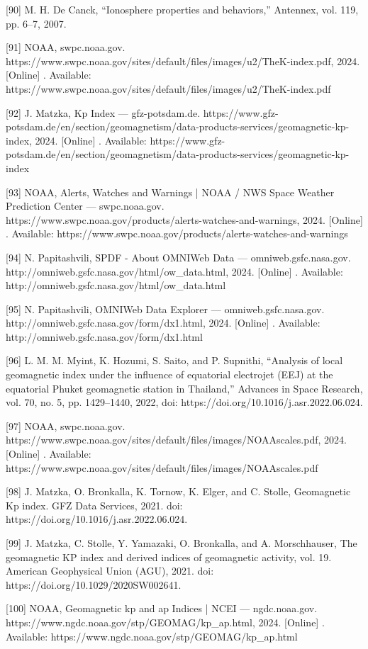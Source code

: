 \documentclass[sn-mathphys-num]{sn-jnl}%
\begin{document}
[90] M. H. De Canck, “Ionosphere properties and behaviors,” Antennex, vol. 119, pp. 6–7, 2007.

[91] NOAA, swpc.noaa.gov. https://www.swpc.noaa.gov/sites/default/files/images/u2/TheK-index.pdf, 2024. [Online] . Available: https://www.swpc.noaa.gov/sites/default/files/images/u2/TheK-index.pdf

[92] J. Matzka, Kp Index — gfz-potsdam.de. https://www.gfz-potsdam.de/en/section/geomagnetism/data-products-services/geomagnetic-kp-index, 2024. [Online] . Available: https://www.gfz-potsdam.de/en/section/geomagnetism/data-products-services/geomagnetic-kp-index

[93] NOAA, Alerts, Watches and Warnings | NOAA / NWS Space Weather Prediction Center — swpc.noaa.gov. https://www.swpc.noaa.gov/products/alerts-watches-and-warnings, 2024. [Online] . Available: https://www.swpc.noaa.gov/products/alerts-watches-and-warnings

[94] N. Papitashvili, SPDF - About OMNIWeb Data — omniweb.gsfc.nasa.gov. http://omniweb.gsfc.nasa.gov/html/ow_data.html, 2024. [Online] . Available: http://omniweb.gsfc.nasa.gov/html/ow_data.html

[95] N. Papitashvili, OMNIWeb Data Explorer — omniweb.gsfc.nasa.gov. http://omniweb.gsfc.nasa.gov/form/dx1.html, 2024. [Online] . Available: http://omniweb.gsfc.nasa.gov/form/dx1.html

[96] L. M. M. Myint, K. Hozumi, S. Saito, and P. Supnithi, “Analysis of local geomagnetic index under the influence of equatorial electrojet (EEJ) at the equatorial Phuket geomagnetic station in Thailand,” Advances in Space Research, vol. 70, no. 5, pp. 1429–1440, 2022, doi: https://doi.org/10.1016/j.asr.2022.06.024.

[97] NOAA, swpc.noaa.gov. https://www.swpc.noaa.gov/sites/default/files/images/NOAAscales.pdf, 2024. [Online] . Available: https://www.swpc.noaa.gov/sites/default/files/images/NOAAscales.pdf

[98] J. Matzka, O. Bronkalla, K. Tornow, K. Elger, and C. Stolle, Geomagnetic Kp index. GFZ Data Services, 2021. doi: https://doi.org/10.1016/j.asr.2022.06.024.

[99] J. Matzka, C. Stolle, Y. Yamazaki, O. Bronkalla, and A. Morschhauser, The geomagnetic KP index and derived indices of geomagnetic activity, vol. 19. American Geophysical Union (AGU), 2021. doi: https://doi.org/10.1029/2020SW002641.

[100] NOAA, Geomagnetic kp and ap Indices | NCEI — ngdc.noaa.gov. https://www.ngdc.noaa.gov/stp/GEOMAG/kp_ap.html, 2024. [Online] . Available: https://www.ngdc.noaa.gov/stp/GEOMAG/kp_ap.html
\end{document}
